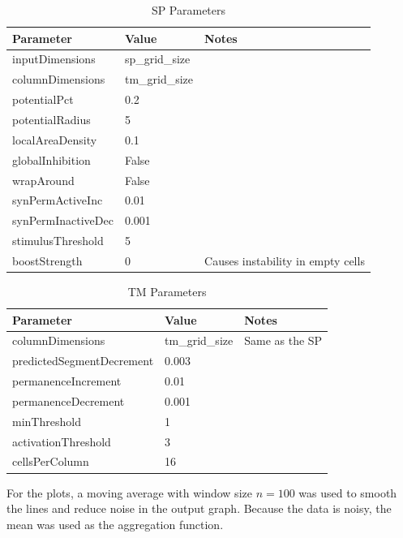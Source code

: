 \begin{table}[H]
    \centering
    \begin{tabularx}{\linewidth}{@{}XlX@{}}
        \toprule
        \textbf{Parameter} & \textbf{Value} & \textbf{Notes}                    \\
        \midrule
        inputDimensions    & sp\_grid\_size &                                   \\
        columnDimensions   & tm\_grid\_size &                                   \\
        potentialPct       & 0.2            &                                   \\
        potentialRadius    & 5              &                                   \\
        localAreaDensity   & 0.1            &                                   \\
        globalInhibition   & False          &                                   \\
        wrapAround         & False          &                                   \\
        synPermActiveInc   & 0.01           &                                   \\
        synPermInactiveDec & 0.001                                              \\
        stimulusThreshold  & 5              &                                   \\
        boostStrength      & 0              & Causes instability in empty cells \\
        \bottomrule
    \end{tabularx}
    \caption{SP Parameters}
    \label{tab:sperm_sp_param}
\end{table}
\begin{table}[H]
    \centering
    \begin{tabularx}{\linewidth}{@{}XlX@{}}
        \toprule
        \textbf{Parameter}        & \textbf{Value} & \textbf{Notes} \\
        \midrule
        columnDimensions          & tm\_grid\_size & Same as the SP \\
        predictedSegmentDecrement & 0.003          &                \\
        permanenceIncrement       & 0.01           &                \\
        permanenceDecrement       & 0.001          &                \\
        minThreshold              & 1              &                \\
        activationThreshold       & 3              &                \\
        cellsPerColumn            & 16             &                \\
        \bottomrule
    \end{tabularx}
    \caption{TM Parameters}
    \label{tab:sperm_tm_param}
\end{table}
For the plots, a moving average with window size $n=100$ was used to smooth the lines and reduce noise in the output graph. Because the data is noisy, the mean was used as the aggregation function.
